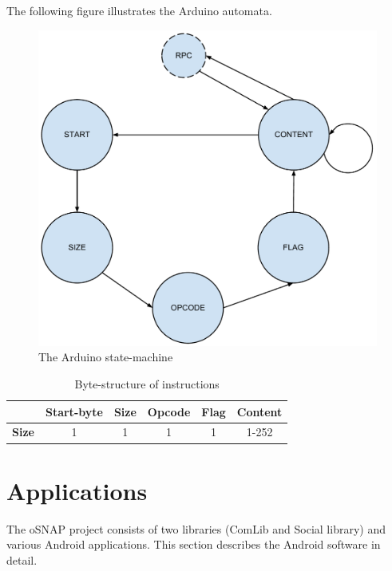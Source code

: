 The following figure illustrates the Arduino automata.

\begin{figure}[h!]
	\centering
	\includegraphics[width=\textwidth, keepaspectratio]{img/arduino_state-machine.pdf}
	\caption{The Arduino state-machine}
	\label{fig:arduino_states}
\end{figure}

\begin{table}[H]
	\begin{tabular}{c|c|c|c|c|c|}
		\cline{2-6}
		& \textbf{Start-byte} & \textbf{Size} & \textbf{Opcode} & \textbf{Flag} & \textbf{Content} \\
		\hline
		\multicolumn{1}{|c|}{\textbf{Size}} & 1 & 1 & 1 & 1 & 1-252 \\
		\hline
	\end{tabular}
	\caption{Byte-structure of instructions}
	\label{tbl:instr_struct}
\end{table}


\section{Applications}
The oSNAP project consists of two libraries (ComLib and Social library) and
various Android applications. This section describes the Android software in detail.

